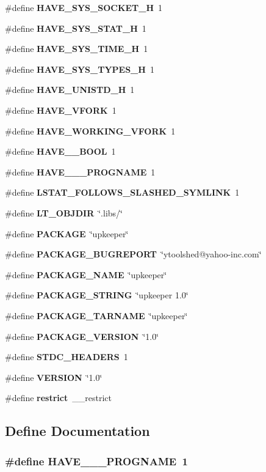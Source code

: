 \begin{DoxyCompactItemize}
\item 
\#define {\bf HAVE\_\-SYS\_\-SOCKET\_\-H}~1
\item 
\#define {\bf HAVE\_\-SYS\_\-STAT\_\-H}~1
\item 
\#define {\bf HAVE\_\-SYS\_\-TIME\_\-H}~1
\item 
\#define {\bf HAVE\_\-SYS\_\-TYPES\_\-H}~1
\item 
\#define {\bf HAVE\_\-UNISTD\_\-H}~1
\item 
\#define {\bf HAVE\_\-VFORK}~1
\item 
\#define {\bf HAVE\_\-WORKING\_\-VFORK}~1
\item 
\#define {\bf HAVE\_\-\_\-BOOL}~1
\item 
\#define {\bf HAVE\_\-\_\-\_\-PROGNAME}~1
\item 
\#define {\bf LSTAT\_\-FOLLOWS\_\-SLASHED\_\-SYMLINK}~1
\item 
\#define {\bf LT\_\-OBJDIR}~\char`\"{}.libs/\char`\"{}
\item 
\#define {\bf PACKAGE}~\char`\"{}upkeeper\char`\"{}
\item 
\#define {\bf PACKAGE\_\-BUGREPORT}~\char`\"{}ytoolshed@yahoo-\/inc.com\char`\"{}
\item 
\#define {\bf PACKAGE\_\-NAME}~\char`\"{}upkeeper\char`\"{}
\item 
\#define {\bf PACKAGE\_\-STRING}~\char`\"{}upkeeper 1.0\char`\"{}
\item 
\#define {\bf PACKAGE\_\-TARNAME}~\char`\"{}upkeeper\char`\"{}
\item 
\#define {\bf PACKAGE\_\-VERSION}~\char`\"{}1.0\char`\"{}
\item 
\#define {\bf STDC\_\-HEADERS}~1
\item 
\#define {\bf VERSION}~\char`\"{}1.0\char`\"{}
\item 
\#define {\bf restrict}~\_\-\_\-restrict
\end{DoxyCompactItemize}


\subsection{Define Documentation}
\subsubsection[{HAVE\_\-\_\-\_\-PROGNAME}]{\setlength{\rightskip}{0pt plus 5cm}\#define HAVE\_\-\_\-\_\-PROGNAME~1}\label{upkeeper__config_8h_a9f377282a580b4f12e7a962fee33d146}
